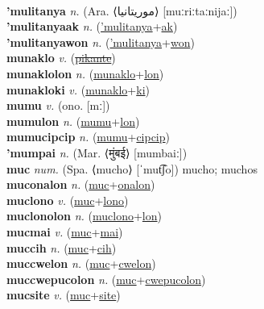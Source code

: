  \label{muafakiles} \\
\textbf{'mulitanya} \textit{n.} (Ara. ⟨موريتانيا‎⟩ [muːriːtaːnijaː])
 \label{'mulitanya} \\
\textbf{'mulitanyaak} \textit{n.} (\hyperref['mulitanya]{'mulitanya}+\hyperref[ak]{ak})
 \label{'mulitanyaak} \\
\textbf{'mulitanyawon} \textit{n.} (\hyperref['mulitanya]{'mulitanya}+\hyperref[won]{won})
 \label{'mulitanyawon} \\
\textbf{munaklo} \textit{v.} (\hyperref[pikante]{\sout{pikante}})
 \label{munaklo} \\
\textbf{munaklolon} \textit{n.} (\hyperref[munaklo]{munaklo}+\hyperref[lon]{lon})
 \label{munaklolon} \\
\textbf{munakloki} \textit{v.} (\hyperref[munaklo]{munaklo}+\hyperref[ki]{ki})
 \label{munakloki} \\
\textbf{mumu} \textit{v.} (ono. [mː])
 \label{mumu} \\
\textbf{mumulon} \textit{n.} (\hyperref[mumu]{mumu}+\hyperref[lon]{lon})
 \label{mumulon} \\
\textbf{mumucipcip} \textit{n.} (\hyperref[mumu]{mumu}+\hyperref[cipcip]{cipcip})
 \label{mumucipcip} \\
\textbf{'mumpai} \textit{n.} (Mar. ⟨मुंबई⟩ [mumbaiː])
 \label{'mumpai} \\
\textbf{muc} \textit{num.} (Spa. ⟨mucho⟩ [ˈmut͡ʃo])
mucho; muchos \label{muc} \\
\textbf{muconalon} \textit{n.} (\hyperref[muc]{muc}+\hyperref[onalon]{onalon})
 \label{muconalon} \\
\textbf{muclono} \textit{v.} (\hyperref[muc]{muc}+\hyperref[lono]{lono})
 \label{muclono} \\
\textbf{muclonolon} \textit{n.} (\hyperref[muclono]{muclono}+\hyperref[lon]{lon})
 \label{muclonolon} \\
\textbf{mucmai} \textit{v.} (\hyperref[muc]{muc}+\hyperref[mai]{mai})
 \label{mucmai} \\
\textbf{muccih} \textit{n.} (\hyperref[muc]{muc}+\hyperref[cih]{cih})
 \label{muccih} \\
\textbf{muccwelon} \textit{n.} (\hyperref[muc]{muc}+\hyperref[cwelon]{cwelon})
 \label{muccwelon} \\
\textbf{muccwepucolon} \textit{n.} (\hyperref[muc]{muc}+\hyperref[cwepucolon]{cwepucolon})
 \label{muccwepucolon} \\
\textbf{mucsite} \textit{v.} (\hyperref[muc]{muc}+\hyperref[site]{site})
 \label{mucsite} \\
